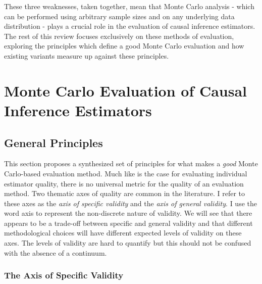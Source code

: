 \documentclass[../main.tex]{subfiles}
\begin{document}
\vspace{\baselineskip}
These three weaknesses, taken together, mean that Monte Carlo analysis - which can be performed using arbitrary sample sizes and on any underlying data distribution - plays a crucial role in the evaluation of causal inference estimators. The rest of this review focuses exclusively on these methods of evaluation, exploring the principles which define a good Monte Carlo evaluation and how existing variants measure up against these principles.\par

\section{Monte Carlo Evaluation of Causal Inference Estimators}
\subsection{General Principles}

\vspace{\baselineskip}
This section proposes a synthesized set of principles for what makes a \textit{good }Monte Carlo-based evaluation method. Much like is the case for evaluating individual estimator quality, there is no universal metric for the quality of an evaluation method. Two thematic axes of quality are common in the literature. I refer to these axes as the \textit{axis of specific validity }and the\textit{ axis of general validity}. I use the word axis to represent the non-discrete nature of validity. We will see that there appears to be a trade-off between specific and general validity and that different methodological choices will have different expected levels of validity on these axes. The levels of validity are hard to quantify but this should not be confused with the absence of a continuum.\par

\subsubsection{The Axis of Specific Validity}
\end{document}
